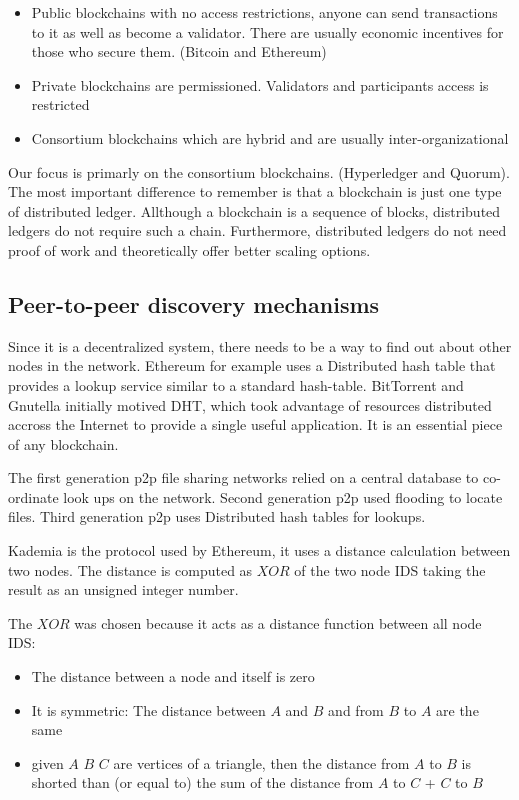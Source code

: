 \documentclass{article}
\begin{document}
\begin{itemize}
  \item Public blockchains with no access restrictions, anyone can send transactions to it as well as become a validator. There are usually economic incentives for those who secure them. (Bitcoin and Ethereum)
  \item Private blockchains are permissioned. Validators and participants access is restricted
  \item Consortium blockchains which are hybrid and are usually inter-organizational
\end{itemize}

Our focus is primarly on the consortium blockchains. (Hyperledger and Quorum). The most important difference to remember is that a blockchain is just one type of distributed ledger. Allthough a blockchain is a sequence of blocks, distributed ledgers do not require such a chain. Furthermore, distributed ledgers do not need proof of work and theoretically offer better scaling options.

\subsection{Peer-to-peer discovery mechanisms}

Since it is a decentralized system, there needs to be a way to find out about other nodes in the network. Ethereum for example uses a Distributed hash table that provides a lookup service similar to a standard hash-table. BitTorrent and Gnutella initially motived DHT, which took advantage of resources distributed accross the Internet to provide a single useful application. It is an essential piece of any blockchain. \newline

The first generation p2p file sharing networks relied on a central database to co-ordinate look ups on the network. Second generation p2p used flooding to locate files. Third generation p2p uses Distributed hash tables for lookups. \newline

Kademia is the protocol used by Ethereum, it uses a distance calculation between two nodes. The distance is computed as $XOR$ of the two node IDS taking the result as an unsigned integer number. 

The $XOR$ was chosen because it acts as a distance function between all node IDS:




\begin{itemize}
  \item The distance between a node and itself is zero
  \item It is symmetric: The distance between $A$ and $B$ and from $B$ to $A$ are the same
  \item given $A$ $B$ $C$ are vertices of a triangle, then the distance from $A$ to $B$ is shorted than (or equal to) the sum of the distance from $A$ to $C$ + $C$ to $B$
\end{itemize}
\end{document}
